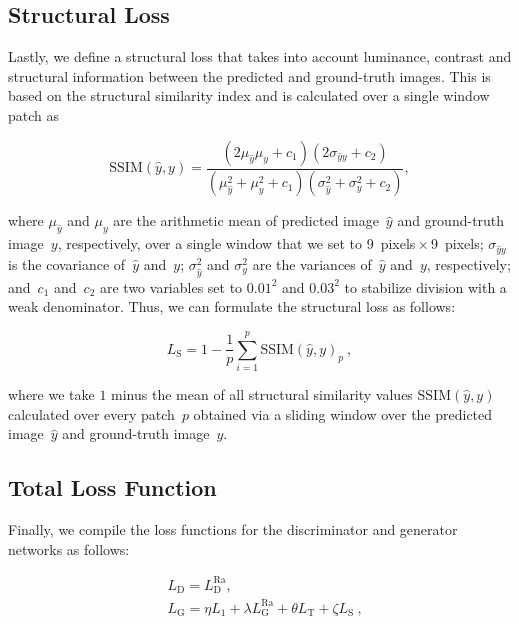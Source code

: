 \begin{appendices}
\subsection{Structural Loss}

Lastly, we define a structural loss that takes into account luminance, contrast and structural information between the predicted and ground-truth images.
This is based on the structural similarity index \citep[SSIM;][]{WangImageQualityAssessment2004} and is calculated over a single window patch as

\begin{equation}\label{eq:A6}
  \text{SSIM} (\hat{y}, y) = \dfrac{(2\mu_{\hat{y}}\mu_y + c_1)(2\sigma_{{\hat{y}}y} + c_2)}{(\mu_{\hat{y}}^2 + \mu_y^2 + c_1)(\sigma_{\hat{y}}^2 + \sigma_y^2 + c_2)},
\end{equation}

where $\mu_{\hat{y}}$ and $\mu_y$ are the arithmetic mean of predicted image~${\hat{y}}$ and ground-truth image~$y$, respectively, over a single window that we set to 9~pixels\,$\times$\,9~pixels; $\sigma_{{\hat{y}}y}$ is the covariance of~${\hat{y}}$ and~$y$; $\sigma_{\hat{y}}^2$ and $\sigma_y^2$ are the variances of~${\hat{y}}$ and~$y$, respectively; and~$c_1$ and~$c_2$ are two variables set to $0.01^2$ and $0.03^2$ to stabilize division with a weak denominator.
Thus, we can formulate the structural loss as follows:

\begin{equation}\label{eq:A7}
  L_{\mathrm{S}} = 1 - \dfrac{1}{p} \sum\limits_{i=1}^p \text{SSIM} (\hat{y}, y)_p~,
\end{equation}

where we take $1$ minus the mean of all structural similarity values $\text{SSIM}(\hat{y}, y)$ calculated over every patch~$p$ obtained via a sliding window over the predicted image~${\hat{y}}$ and ground-truth image~$y$.

\subsection{Total Loss Function}

Finally, we compile the loss functions for the discriminator and generator networks as follows:

\begin{align}
  & L_{\mathrm{D}} = L_{\mathrm{D}}^{\text{Ra}}, \label{eq:A8}\\
  & L_{\mathrm{G}} = \eta L_1 + \lambda L_{\mathrm{G}}^{\text{Ra}} + \theta L_{\mathrm{T}} + \zeta L_{\mathrm{S}}~, \label{eq:A9}
\end{align}


\end{appendices}
